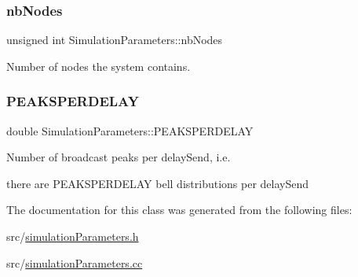 \subsubsection{\texorpdfstring{nb\+Nodes}{nbNodes}}
{\footnotesize\ttfamily unsigned int Simulation\+Parameters\+::nb\+Nodes}



Number of nodes the system contains. 

\mbox{\label{class_simulation_parameters_a57cd536ac7c057b5c2d5c85faa4d846d}} 
\subsubsection{\texorpdfstring{P\+E\+A\+K\+S\+P\+E\+R\+D\+E\+L\+AY}{PEAKSPERDELAY}}
{\footnotesize\ttfamily double Simulation\+Parameters\+::\+P\+E\+A\+K\+S\+P\+E\+R\+D\+E\+L\+AY}



Number of broadcast peaks per delay\+Send, i.\+e. 

there are P\+E\+A\+K\+S\+P\+E\+R\+D\+E\+L\+AY bell distributions per delay\+Send 

The documentation for this class was generated from the following files\+:\begin{DoxyCompactItemize}
\item 
src/\hyperlink{simulation_parameters_8h}{simulation\+Parameters.\+h}\item 
src/\hyperlink{simulation_parameters_8cc}{simulation\+Parameters.\+cc}\end{DoxyCompactItemize}

